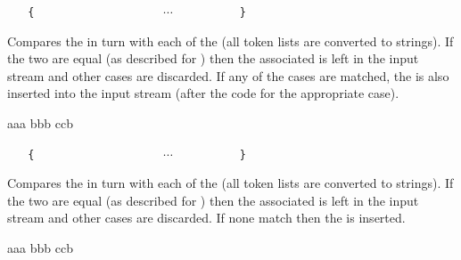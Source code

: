 \documentclass[oneside]{book}
\begin{document}
\begin{function}{\strCaseT}
\begin{syntax}
 
~ ~ \verb|{|
~ ~ ~ ~  
~ ~ ~ ~  
~ ~ ~ ~ $\cdots$
~ ~ ~ ~  
~ ~ \verb|}|
~ ~ 
\end{syntax}
Compares the  in turn with each
of the  (all token lists are converted to strings).
If the two are equal (as described for
) then the associated  is left in the
input stream and other cases are discarded. If any of the
cases are matched, the  is also inserted into the
input stream (after the code for the appropriate case).
\begin{demohigh}
\IgnoreSpacesOn
{} {
  {aaa} {\tlSet{}}
  {bbb} {\tlSet{}}
  {ccb} {\tlSet{}}
}{
  \prgReturn{\tlUse\lTmpkTl}
}
\IgnoreSpacesOff
\end{demohigh}
\end{function}

\begin{function}{\strCaseF}
\begin{syntax}
 
~ ~ \verb|{|
~ ~ ~ ~  
~ ~ ~ ~  
~ ~ ~ ~ $\cdots$
~ ~ ~ ~  
~ ~ \verb|}|
~ ~ 
\end{syntax}
Compares the  in turn with each
of the  (all token lists are converted to strings).
If the two are equal (as described for
) then the associated  is left in the
input stream and other cases are discarded. If none
match then the  is inserted.
\begin{demohigh}
\IgnoreSpacesOn
{} {
  {aaa} {}
  {bbb} {}
  {ccb} {}
}{
}
\IgnoreSpacesOff
\end{demohigh}
\end{function}
\end{document}
